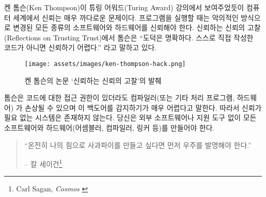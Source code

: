 \begin{comment}
As Ken Thompson showed in his Turing Award lecture, trust is an
extremely tricky thing in the computational world. When running a
program, you have to trust all kinds of software (and hardware) which,
in theory, could alter the program you are trying to run in a malicious
way. As Thompson summarized in his \textit{Reflections on Trusting Trust}:
\enquote{The moral is obvious. You can't trust code that you did not totally
create yourself.}~\cite{trusting-trust}
\end{comment}
켄 톰슨(Ken Thompson)이 튜링 어워드(Turing Award) 강의에서 보여주었듯이 컴퓨터 세계에서 신뢰는 매우 까다로운 문제이다.
프로그램을 실행할 때는 악의적인 방식으로 변경된 모든 종류의 소프트웨어와 하드웨어를 신뢰해야 한다.
신뢰하는 신뢰의 고찰(Reflections on Trusting Trust)에서 톰슨은
\enquote{도덕은 명확하다. 스스로 직접 작성한 코드가 아니면 신뢰하기 어렵다.}\cite{trusting-trust}
라고 말하고 있다.

\begin{figure}
  \texttt{[image: assets/images/ken-thompson-hack.png]}
  \caption{켄 톰슨의 논문 `신뢰하는 신뢰의 고찰'의 발췌}
  \label{fig:ken-thompson-hack}
\end{figure}

\begin{comment}
Thompson demonstrated that even if you have access to the source code,
your compiler --- or any other program-handling program or
hardware --- could be compromised and detecting this backdoor would be
very difficult. Thus, in practice, a truly \textit{trustless} system does not
exist. You would have to create all your software \textit{and} all your
hardware (assemblers, compilers, linkers, etc.) from scratch, without
the aid of any external software or software-aided machinery.
\end{comment}
톰슨은 코드에 대한 접근 권한이 있더라도 컴파일러(또는 기타 처리 프로그램, 하드웨어)
가 손상될 수 있으며 이 백도어를 감지하기가 매우 어렵다고 말한다. 
따라서 신뢰가 필요 없는 시스템은 존재하지 않는다.
당신은 외부 소프트웨어나 지원 도구 없이 모든 소프트웨어와 하드웨어(어셈블러, 컴파일러, 링커 등)를 만들어야 한다.

\begin{quotation}\begin{samepage}
\enquote{온전히 나의 힘으로 사과파이를 만들고 싶다면 먼저 우주를 발명해야 한다.}
\begin{flushright} -- 칼 세이건\footnote{Carl Sagan, \textit{Cosmos} \cite{cosmos}}
\end{flushright}\end{samepage}\end{quotation}

